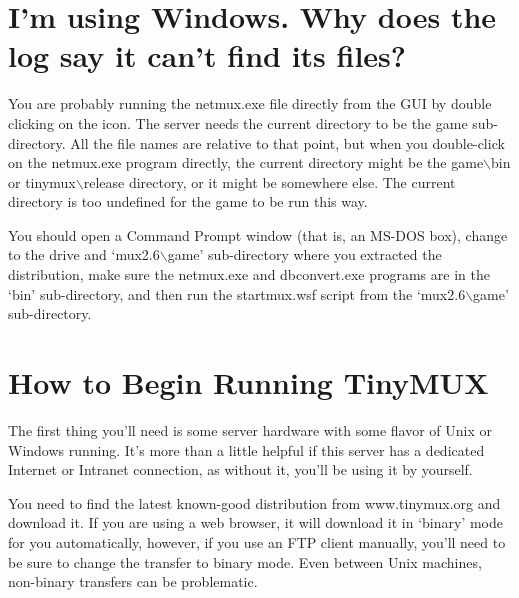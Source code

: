 \documentclass[10pt,letterpaper]{book}
\begin{document}
\section{I'm using Windows. Why does the log say it can't find its files?}
You are probably running the netmux.exe file directly from the GUI by double
clicking on the icon. The server needs the current directory to be the game
sub-directory. All the file names are relative to that point, but when you
double-click on the netmux.exe program directly, the current directory might
be the game$\backslash$bin or tinymux$\backslash$release directory, or it
might be somewhere else.  The current directory is too undefined for the game
to be run this way.

You should open a Command Prompt window (that is, an MS-DOS box), change to
the drive and `mux2.6$\backslash$game' sub-directory where you extracted the
distribution, make sure the netmux.exe and dbconvert.exe
programs are in the `bin' sub-directory, and then run the startmux.wsf
script from the `mux2.6$\backslash$game' sub-directory.
\section{How to Begin Running TinyMUX}
The first thing you'll need is some server hardware with some flavor of Unix or
Windows running. It's more than a little helpful if this server has a dedicated
Internet or Intranet connection, as without it, you'll be using it by yourself.

You need to find the latest known-good distribution from
www.tinymux.org and download it. If you are using a web browser, it will
download it in `binary' mode for you automatically, however, if you use an FTP
client manually, you'll need to be sure to change the transfer to binary mode.
Even between Unix machines, non-binary transfers can be problematic.
\end{document}
